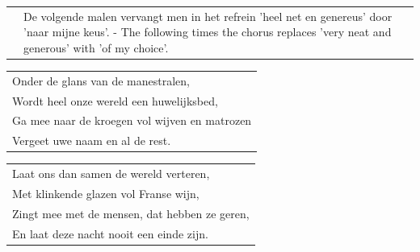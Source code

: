 \documentclass[a4paper, 14pt]{extarticle}
\begin{document}
\begin{flushleft}
\begin{tabularx}{0.8\textwidth} {
   c >{\raggedright\arraybackslash}X}
\hspace{5mm} & {\small De volgende malen vervangt men in het refrein ’heel net en genereus’ door ’naar mijne keus’. - The following times the chorus replaces 'very neat and generous' with 'of my choice'.}
\end{tabularx}
\end{flushleft}
\begin{flushleft}
\begin{tabularx}{0.8\textwidth} {
   >{\raggedright\arraybackslash}X}
Onder de glans van de manestralen, \\
Wordt heel onze wereld een huwelijksbed, \\
Ga mee naar de kroegen vol wijven en matrozen \\
Vergeet uwe naam en al de rest. \\
\end{tabularx}
\end{flushleft}
\begin{flushleft}
\begin{tabularx}{0.8\textwidth} {
    >{\raggedright\arraybackslash}X}
Laat ons dan samen de wereld verteren, \\
Met klinkende glazen vol Franse wijn, \\
Zingt mee met de mensen, dat hebben ze geren, \\
En laat deze nacht nooit een einde zijn. \\
\end{tabularx}
\end{flushleft}
\end{document}
